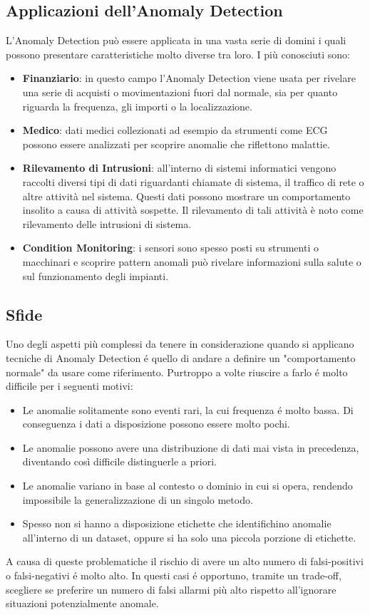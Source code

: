\subsection{Applicazioni dell'Anomaly Detection}
L'Anomaly Detection può essere applicata in una vasta serie di domini i quali possono presentare caratteristiche molto diverse tra loro. I più conosciuti sono:
\begin{itemize}
	\item \textbf{Finanziario}: in questo campo l'Anomaly Detection viene usata per rivelare una serie di acquisti o movimentazioni fuori dal normale, sia per quanto riguarda la frequenza, gli importi o la localizzazione.
	\item \textbf{Medico}: dati medici collezionati ad esempio da strumenti come ECG possono essere analizzati per scoprire anomalie che riflettono malattie.
	\item \textbf{Rilevamento di Intrusioni}: all'interno di sistemi informatici vengono raccolti diversi tipi di dati riguardanti chiamate di sistema, il traffico di rete o altre attività nel sistema. Questi dati possono mostrare un comportamento insolito a causa di attività sospette. Il rilevamento di tali attività è noto come rilevamento delle intrusioni di sistema.
	\item \textbf{Condition Monitoring}: i sensori sono spesso posti su strumenti o macchinari e scoprire pattern anomali può rivelare informazioni sulla salute o sul funzionamento degli impianti.
\end{itemize}

\subsection{Sfide}
Uno degli aspetti più complessi da tenere in considerazione quando si applicano tecniche di Anomaly Detection é quello di andare a definire un "comportamento normale" da usare come riferimento. Purtroppo a volte riuscire a farlo é molto difficile per i seguenti motivi:
\begin{itemize}
	\item Le anomalie solitamente sono eventi rari, la cui frequenza é molto bassa. Di conseguenza i dati a disposizione possono essere molto pochi.
	\item Le anomalie possono avere una distribuzione di dati mai vista in precedenza, diventando così difficile distinguerle a priori.
	\item Le anomalie variano in base al contesto o dominio in cui si opera, rendendo impossibile la generalizzazione di un singolo metodo.
	\item Spesso non si hanno a disposizione etichette che identifichino anomalie all'interno di un dataset, oppure si ha solo una piccola porzione di etichette.
\end{itemize}
A causa di queste problematiche il rischio di avere un alto numero di falsi-positivi o falsi-negativi é molto alto. In questi casi é opportuno, tramite un trade-off, scegliere se preferire un numero di falsi allarmi più alto rispetto all'ignorare situazioni potenzialmente anomale.

